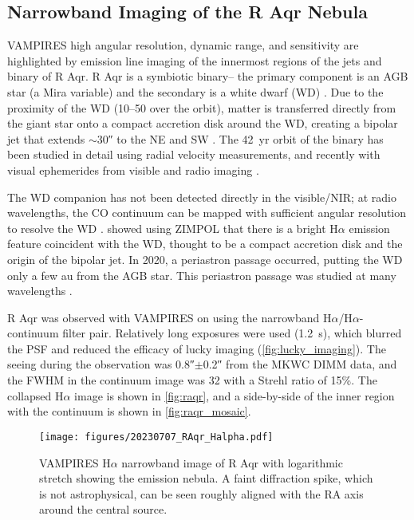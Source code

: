 \subsection{Narrowband Imaging of the R Aqr Nebula\label{sec:raqr}}

VAMPIRES high angular resolution, dynamic range, and sensitivity are highlighted by emission line imaging of the innermost regions of the jets and binary of R Aqr. R Aqr is a symbiotic binary-- the primary component is an AGB star (a Mira variable) and the secondary is a white dwarf (WD) \citep{merrill_partial_1935,merrill_spectra_1940}. Due to the proximity of the WD (\SIrange{10}{50}{\mas} over the orbit), matter is transferred directly from the giant star onto a compact accretion disk around the WD, creating a bipolar jet that extends $\sim$\ang{;;30} to the NE and SW \citep[and references therein]{schmid_spherezimpol_2017}. The \SI{42}{yr} orbit of the binary has been studied in detail using radial velocity measurements, and recently with visual ephemerides from visible and radio imaging \citep{gromadzki_spectroscopic_2009,bujarrabal_high-resolution_2018,alcolea_determining_2023}. 

The WD companion has not been detected directly in the visible/NIR; at radio wavelengths, the CO continuum can be mapped with sufficient angular resolution to resolve the WD \citep{bujarrabal_high-resolution_2018,alcolea_determining_2023}. \citet{schmid_spherezimpol_2017} showed using ZIMPOL that there is a bright H$\alpha$ emission feature coincident with the WD, thought to be a compact accretion disk and the origin of the bipolar jet. In 2020, a periastron passage occurred, putting the WD only a few \si{au} from the AGB star. This periastron passage was studied at many wavelengths \citep{hinkle_2020_2022,sacchi_front-row_2024}.

R Aqr was observed with VAMPIRES on  using the narrowband H$\alpha$/H$\alpha$-continuum filter pair. Relatively long exposures were used (\SI{1.2}{s}), which blurred the PSF and reduced the efficacy of lucky imaging (\autoref{fig:lucky_imaging}). The seeing during the observation was \ang{;;0.8}$\pm$\ang{;;0.2} from the MKWC DIMM data, and the FWHM in the continuum image was \SI{32}{\mas} with a Strehl ratio of 15\%. The collapsed H$\alpha$ image is shown in \autoref{fig:raqr}, and a side-by-side of the inner region with the continuum is shown in \autoref{fig:raqr_mosaic}.


\begin{figure}[h]
    \centering
    \texttt{[image: figures/20230707\_RAqr\_Halpha.pdf]}
    \caption{VAMPIRES H$\alpha$ narrowband image of R Aqr with logarithmic stretch showing the emission nebula. A faint diffraction spike, which is not astrophysical, can be seen roughly aligned with the RA axis around the central source.\label{fig:raqr}}
\end{figure}

